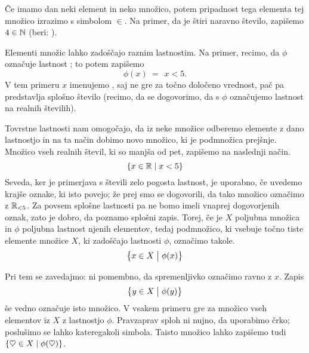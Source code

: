 
                Če imamo dan neki element in neko množico, potem pripadnost tega elementa tej množico izrazimo s simbolom $\in$. Na primer, da je štiri naravno število, zapišemo $4 \in \mathbb{N}$ (beri: ).

                Elementi množic lahko zadoščajo raznim lastnostim. Na primer, recimo, da $\phi$ označuje lastnost ; to potem zapišemo
                \[\phi(x) \ = \ \ x < 5.\]
                V tem primeru $x$ imenujemo , saj ne gre za točno določeno vrednost, pač pa predstavlja splošno število (recimo, da se dogovorimo, da s $\phi$ označujemo lastnost na realnih številih).

                Tovrstne lastnosti nam omogočajo, da iz neke množice odberemo elemente z dano lastnostjo in na ta način dobimo novo množico, ki je podmnožica prejšnje. Množico vseh realnih števil, ki so manjša od pet, zapišemo na naslednji način.
                \[\set{x \in \RR}{x < 5}\]
                Seveda, ker je primerjava s števili zelo pogosta lastnost, je uporabno, če uvedemo krajše oznake, ki isto povejo; že prej smo se dogovorili, da tako množico označimo z $\mathbb{R}_{< 5}$. Za povsem splošne lastnosti pa ne bomo imeli vnaprej dogovorjenih oznak, zato je dobro, da poznamo splošni zapis. Torej, če je $X$ poljubna množica in $\phi$ poljubna lastnost njenih elementov, tedaj podmnožico, ki vsebuje točno tiste elemente množice $X$, ki zadoščajo lastnosti $\phi$, označimo takole.
                \[\set[1]{x \in X}{\phi(x)}\]

                Pri tem se zavedajmo: ni pomembno, da spremenljivko označimo ravno z $x$. Zapis
                \[\set[1]{y \in X}{\phi(y)}\]
                še vedno označuje isto množico. V vsakem primeru gre za množico vseh elementov iz $X$ z lastnostjo $\phi$. Pravzaprav sploh ni nujno, da uporabimo črko; poslušimo se lahko kateregakoli simbola. Taisto množico lahko zapišemo tudi $\set{\heartsuit \in X}{\phi(\heartsuit)}$.

